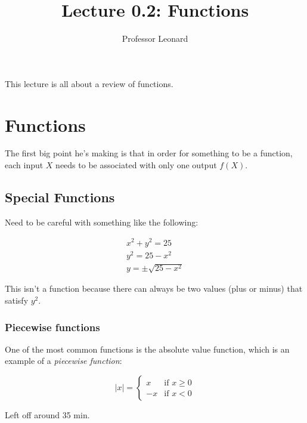 \documentclass{article}
\begin{document}
\title{Lecture 0.2: Functions}
\author{Professor Leonard}
\maketitle

This lecture is all about a review of functions.


\section{Functions}
The first big point he's making is that in order for something to be a function, each
input $X$ needs to be associated with only one output $f(X)$.

\subsection{Special Functions}

Need to be careful with something like the following:

\begin{align}
    x^2 + y^2 = 25\\
    y^2 = 25 - x^2\\
    y = \pm \sqrt{25 - x^2}
\end{align}

This isn't a function because there can always be two values (plus or minus) that satisfy
$y^2$.\\

\subsubsection{Piecewise functions}

One of the most common functions is the absolute value function, which is an example of a
\emph{piecewise function}:

\begin{equation}
    \lvert x \rvert = 
    \begin{cases}
        x & \text{if } x \geq 0\\
        -x & \text{if } x < 0
    \end{cases}
\end{equation}

Left off around 35 min.
\end{document}
